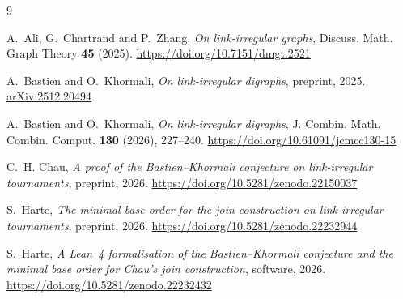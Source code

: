 \documentclass[11pt]{amsart}
\theoremstyle{definition}
\theoremstyle{remark}
\numberwithin{equation}{section}
\providecommand{\doi}[1]{\url{https://doi.org/#1}}
\begin{document}
\begin{thebibliography}{9}

A.~Ali, G.~Chartrand and P.~Zhang, \emph{On link-irregular graphs}, Discuss. Math. Graph Theory \textbf{45} (2025). \doi{10.7151/dmgt.2521}

A.~Bastien and O.~Khormali, \emph{On link-irregular digraphs}, preprint, 2025. \href{https://arxiv.org/abs/2512.20494}{arXiv:2512.20494}

A.~Bastien and O.~Khormali, \emph{On link-irregular digraphs}, J. Combin. Math. Combin. Comput. \textbf{130} (2026), 227--240. \doi{10.61091/jcmcc130-15}

C.~H. Chau, \emph{A proof of the Bastien--Khormali conjecture on link-irregular tournaments}, preprint, 2026. \doi{10.5281/zenodo.22150037}

S.~Harte, \emph{The minimal base order for the join construction on link-irregular tournaments}, preprint, 2026. \doi{10.5281/zenodo.22232944}

S.~Harte, \emph{A Lean~4 formalisation of the Bastien--Khormali conjecture and the minimal base order for Chau's join construction}, software, 2026. \doi{10.5281/zenodo.22232432}

\end{thebibliography}
\end{document}
